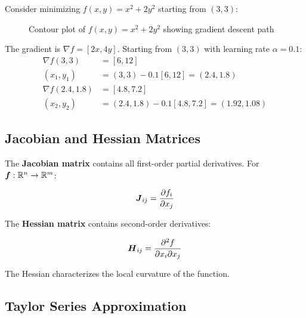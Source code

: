 Consider minimizing $f(x, y) = x^2 + 2y^2$ starting from $(3, 3)$:

\begin{figure}[h]
\centering
{}
\caption{Contour plot of $f(x,y) = x^2 + 2y^2$ showing gradient descent path}
\label{fig:gradient-descent-2d}
\end{figure}

The gradient is $\nabla f = [2x, 4y]$. Starting from $(3, 3)$ with learning rate $\alpha = 0.1$:
\begin{align}
\nabla f(3, 3) &= [6, 12] \\
(x_1, y_1) &= (3, 3) - 0.1[6, 12] = (2.4, 1.8) \\
\nabla f(2.4, 1.8) &= [4.8, 7.2] \\
(x_2, y_2) &= (2.4, 1.8) - 0.1[4.8, 7.2] = (1.92, 1.08)
\end{align}

\subsection{Jacobian and Hessian Matrices}

The \textbf{Jacobian matrix} contains all first-order partial derivatives. For $\boldsymbol{f}: \mathbb{R}^n \to \mathbb{R}^m$:

\begin{equation}
\boldsymbol{J}_{ij} = \frac{\partial f_i}{\partial x_j}
\end{equation}

The \textbf{Hessian matrix} contains second-order derivatives:

\begin{equation}
\boldsymbol{H}_{ij} = \frac{\partial^2 f}{\partial x_i \partial x_j}
\end{equation}

The Hessian characterizes the local curvature of the function.

\subsection{Taylor Series Approximation}

